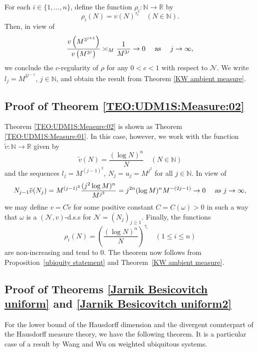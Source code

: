 \documentclass{amsart}
\theoremstyle{definition}
\newcommand{\N}{\mathbb N}%
\newcommand{\R}{\mathbb R}
\newcommand{\0}{\mbf 0}%
\newcommand{\cN}{{\mathcal N}}
\renewcommand{\text}{\textup}
\def\N{\mathbb N}
\def\R{\mathbb R}
\begin{document}
For each $i\in\{1,\ldots, n\}$, define the function $\rho_i:\N\to\R$ by
\[
\rho_i(N) = v(N)^{\tau_i}
\quad (N\in\N).
\]
Then, in view of 
\[
\frac{v\left( M^{3^{j+1}}\right) }{v\left( M^{3^{j}}\right)} 
\asymp_M   
\frac{1}{M^{3^j}} \to 0 \quad\text{ as }\quad j \to\infty,
\]
we conclude the $c$-regularity of $\rho$ for any $0<c<1$ with respect to $\cN$. 
We write $l_j=M^{3^{j-1}}$, $j\in\N$, and obtain the result from Theorem \ref{KW ambient measure}.


\subsection{Proof of Theorem \ref{TEO:UDM1S:Measure:02}}
Theorem \ref{TEO:UDM1S:Measure:02} is shown as Theorem \ref{TEO:UDM1S:Measure:01}. In this case, however, we work with the function $\tilde{v}:\N\to\R$ given by
\[
\tilde{v}(N)
=
\frac{(\log N)^n}{N} 
\quad (N\in\N)
\]
and the sequences $l_j = M^{(j-1)^2}$, $N_j=u_j = M^{j^2}$ for all $j\in\N$. In view of
\begin{equation*}
    N_{j-1}\tilde{v}(N_{j})
    =
    M^{(j-1)^{2}}\frac{(j^{2}\log M)^{n}}{M^{j^{2}}}
    =
    j^{2n}(\log M)^{n} M^{-(2j-1)} 
    \to 0
    \quad\text{ as } j\to \infty,
\end{equation*}
we may define $v=C\tilde{v}$ for some positive constant $C=C(\omega)>0$ in such a way that $\omega$ is a $(\cN, v)$-d.s.s for $\cN=(N_j)_{j\geq 1}$.
Finally, the functions 
\begin{equation} \label{ubiquitous system rho}
    \rho_{i}(N)=\left(\frac{(\log N)^{n}}{N}\right)^{\tau_{i}} \quad (1\leq i \leq n)
\end{equation}
are non-increasing and tend to $0$. The theorem now follows from Proposition~\ref{ubiquity statement} and Theorem~\ref{KW ambient measure}. 

\subsection{Proof of Theorems \ref{Jarnik Besicovitch uniform} and \ref{Jarnik Besicovitch uniform2} }
For the lower bound of the Hausdorff dimension and the divergent counterpart of the Hausdorff measure theory, we have the following theorem. It is a particular case of a result by Wang and Wu \cite[Theorem 3.1-3.2]{WW19} on weighted ubiquitous systems.
\end{document}
